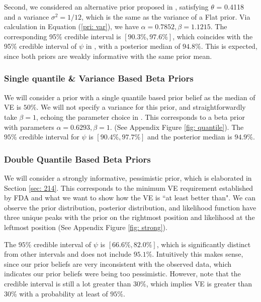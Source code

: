 \documentclass[12pt]{amsart}
\begin{document}
Second, we considered an alternative prior proposed in \cite{blog}, satisfying $\theta$ = 0.4118 and a variance $\sigma^2 = 1 / 12$, which is the same as the variance of a Flat prior. Via calculation in Equation (\ref{pri: var}), we have $\alpha= 0.7852, \beta = 1.1215$. The corresponding 95\% credible interval is $[90.3\%, 97.6\%]$, which coincides with the 95\% credible interval of $\psi$ in \cite{paper}, with a posterior median of $94.8\%$. This is expected, since both priors are weakly informative with the same prior mean.

\subsubsection{Single quantile \& Variance Based Beta Priors}

We will consider a prior with a single quantile based prior belief as the median of VE is $50\%$. We will not specify a variance for this prior, and straightforwardly take $\beta = 1$, echoing the parameter choice in \cite{paper}. This corresponds to a beta prior with parameters $\alpha = 0.6293, \beta = 1$.  (See Appendix Figure \ref{fig: quantile}). The $95\%$ credible interval for $\psi$ is $[90.4\%, 97.7\%]$ and the posterior median is $94.9\%$.

\subsubsection{Double Quantile Based Beta Priors}
We will consider a strongly informative, pessimistic prior, which is elaborated in Section \ref{sec: 214}. This corresponds to the minimum VE requirement established by FDA and what we want to show how the VE is ``at least better than". We can observe the prior distribution, posterior distribution, and likelihood function have three unique peaks with the prior on the rightmost position and likelihood at the leftmost position (See Appendix Figure \ref{fig: strong}).

The $95\%$ credible interval of $\psi$ is $[66.6\%, 82.0\%]$, which is significantly distinct from other intervals and does not include $95.1\%$. Intuitively this makes sense, since our prior beliefs are very inconsistent with the observed data, which indicates our prior beliefs were being too pessimistic. However, note that the credible interval is still a lot greater than $30\%$, which implies VE is greater than 30\% with a probability at least of $95\%$.
\end{document}

